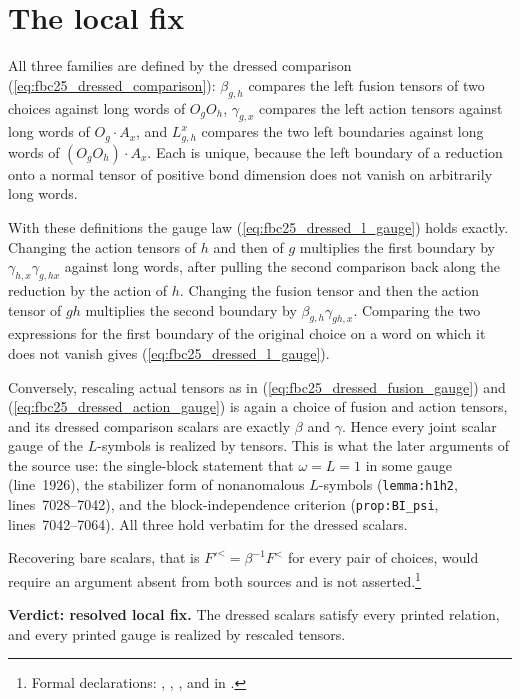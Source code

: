 \documentclass{article}
\begin{document}
\section{The local fix}

All three families are defined by the dressed comparison
(\ref{eq:fbc25_dressed_comparison}): $\beta_{g,h}$ compares the left fusion
tensors of two choices against long words of $O_gO_h$, $\gamma_{g,x}$
compares the left action tensors against long words of $O_g\cdot A_x$, and
$L^x_{g,h}$ compares the two left boundaries against long words of
$(O_gO_h)\cdot A_x$.  Each is unique, because the left boundary of a
reduction onto a normal tensor of positive bond dimension does not vanish on
arbitrarily long words.

With these definitions the gauge law (\ref{eq:fbc25_dressed_l_gauge}) holds
exactly.  Changing the action tensors of $h$ and then of $g$ multiplies the
first boundary by $\gamma_{h,x}\gamma_{g,hx}$ against long words, after
pulling the second comparison back along the reduction by the action of $h$.
Changing the fusion tensor and then the action tensor of $gh$ multiplies the
second boundary by $\beta_{g,h}\gamma_{gh,x}$.  Comparing the two
expressions for the first boundary of the original choice on a word on which
it does not vanish gives (\ref{eq:fbc25_dressed_l_gauge}).

Conversely, rescaling actual tensors as in
(\ref{eq:fbc25_dressed_fusion_gauge}) and
(\ref{eq:fbc25_dressed_action_gauge}) is again a choice of fusion and action
tensors, and its dressed comparison scalars are exactly $\beta$ and
$\gamma$.  Hence every joint scalar gauge of the $L$-symbols is realized by
tensors.  This is what the later arguments of the source use: the single-block
statement that $\omega=L=1$ in some gauge (line~1926), the stabilizer form of
nonanomalous $L$-symbols (\texttt{lemma:h1h2}, lines~7028--7042), and the
block-independence criterion (\texttt{prop:BI\_psi}, lines~7042--7064).  All
three hold verbatim for the dressed scalars.

Recovering bare scalars, that is $F'^<=\beta^{-1}F^<$ for every pair of
choices, would require an argument absent from both sources and is not
asserted.\footnote{Formal declarations:
,
,
, and
 in
.}

\textbf{Verdict: resolved local fix.}
The dressed scalars satisfy every printed relation, and every printed gauge is
realized by rescaled tensors.



\end{document}
